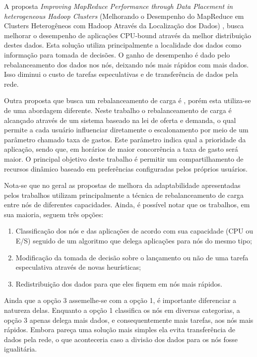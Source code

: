 A proposta \textit{Improving MapReduce Performance through Data Placement in heterogeneous Hadoop Clusters} (Melhorando o Desempenho do MapReduce em Clusters Heterogêneos com Hadoop Através da Localização dos Dados) \cite{IMRPDPHHC}, busca melhorar o desempenho de aplicações CPU-bound através da melhor distribuição destes dados. Esta solução utiliza principalmente a localidade dos dados como informação para tomada de decisões. O ganho de desempenho é dado pelo rebalanceamento dos dados nos nós, deixando nós mais rápidos com mais dados. Isso diminui o custo de tarefas especulativas e de transferência de dados pela rede.

Outra proposta que busca um rebalanceamento de carga é \cite{Sandholm}, porém esta utiliza-se de uma abordagem diferente. Neste trabalho o rebalanceamento de carga é alcançado através de um sistema baseado na lei de oferta e demanda, o qual permite a cada usuário influenciar diretamente o escalonamento por meio de um parâmetro chamado taxa de gastos. Este parâmetro indica qual a prioridade da aplicação, sendo que, em horários de maior concorrência a taxa de gasto será maior. O principal objetivo deste trabalho é permitir um compartilhamento de recursos dinâmico baseado em preferências configuradas pelos próprios usuários.


Nota-se que no geral as propostas de melhora da adaptabilidade apresentadas pelos trabalhos utilizam principalmente a técnica de rebalanceamento de carga entre nós de diferentes capacidades. Ainda, é possível notar que os trabalhos, em sua maioria, seguem três opções:

\begin{enumerate}
	\item Classificação dos nós e das aplicações de acordo com sua capacidade (CPU ou E/S) seguido de um algoritmo que delega aplicações para nós do mesmo tipo;
	\item Modificação da tomada de decisão sobre o lançamento ou não de uma tarefa especulativa através de novas heurísticas;
	\item Redistribuição dos dados para que eles fiquem em nós mais rápidos.
\end{enumerate}

Ainda que a opção 3 assemelhe-se com a opção 1, é importante diferenciar a natureza delas. Enquanto a opção 1 classifica os nós em diversas categorias, a opção 3 apenas delega mais dados, e consequentemente mais tarefas, aos nós mais rápidos. Embora pareça uma solução mais simples ela evita transferência de dados pela rede, o que aconteceria caso a divisão dos dados para os nós fosse igualitária.

